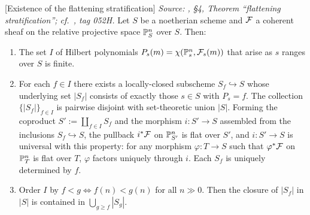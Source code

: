 \begin{theorem}

[Existence of the flattening stratification]
  \label{mk-thm:flattening_stratification_exists}
  \textit{Source: \cite{nitsure-hilbert-quot}, \S4, Theorem ``flattening stratification'';
  cf.\ \cite{stacks-project}, tag 052H.}
  Let \(S\) be a noetherian scheme and \(\mathcal{F}\) a coherent sheaf on the relative
  projective space \(\mathbb{P}^n_S\) over \(S\).  Then:
  \begin{enumerate}[label=(\roman*)]
    \item The set \(I\) of Hilbert polynomials
      \(P_s(m) = \chi(\mathbb{P}^n_s, \mathcal{F}_s(m))\) that arise as \(s\) ranges over \(S\) is
      finite.
    \item For each \(f \in I\) there exists a locally-closed subscheme
      \(S_f \hookrightarrow S\) whose underlying set \(|S_f|\) consists of exactly
      those \(s \in S\) with \(P_s = f\).  The collection \(\{|S_f|\}_{f \in I}\) is
      pairwise disjoint with set-theoretic union \(|S|\).  Forming the coproduct
      \(S' := \coprod_{f \in I} S_f\) and the morphism \(i : S' \to S\) assembled
      from the inclusions \(S_f \hookrightarrow S\), the pullback \(i^* \mathcal{F}\) on
      \(\mathbb{P}^n_{S'}\) is flat over \(S'\), and \(i : S' \to S\) is universal with this
      property: for any morphism \(\varphi : T \to S\) such that \(\varphi^* \mathcal{F}\) on
      \(\mathbb{P}^n_T\) is flat over \(T\), \(\varphi\) factors uniquely through \(i\).
      Each \(S_f\) is uniquely determined by \(f\).
    \item Order \(I\) by \(f < g \iff f(n) < g(n)\) for all \(n \gg 0\). Then the
      closure of \(|S_f|\) in \(|S|\) is contained in \(\bigcup_{g \ge f} |S_g|\).
  \end{enumerate}
\end{theorem}

